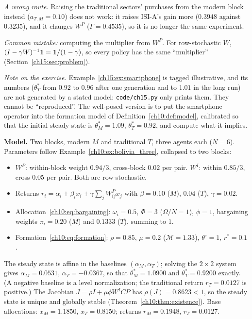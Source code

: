\documentclass[../solutions_manual.tex]{subfiles}
\begin{document}
\emph{A wrong route.} Raising the traditional sectors' purchases from the modern block instead ($a_{T,M} = 0.10$) does not work: it raises ISI-A's gain more ($0.3948$ against $0.3235$), and it changes $W^P$ ($\Gamma = 0.4535$), so it is no longer the same experiment.

\emph{Common mistake:} computing the multiplier from $W^P$. For row-stochastic $W$, $(I - \gamma W)^{-1}\mathbf{1} = \mathbf{1}/(1-\gamma)$, so every policy has the same ``multiplier'' (Section~\ref{ch15:sec:problem}).


\emph{Note on the exercise.} Example~\ref{ch15:ex:smartphone} is tagged illustrative, and its numbers ($\theta^*_T$ from $0.92$ to $0.96$ after one generation and to $1.01$ in the long run) are not generated by a stated model: \nolinkurl{code/ch15.py} only prints them. They cannot be ``reproduced''. The well-posed version is to put the smartphone operator into the formation model of Definition~\ref{ch10:def:model}, calibrated so that the initial steady state is $\theta^*_M = 1.09$, $\theta^*_T = 0.92$, and compute what it implies.

 \textbf{Model.} Two blocks, modern $M$ and traditional $T$, three agents each ($N = 6$). Parameters follow Example~\ref{ch10:ex:bolivia_three}, collapsed to two blocks:
\begin{itemize}
\item $W^P$: within-block weight $0.94/3$, cross-block $0.02$ per pair. $W^I$: within $0.85/3$, cross $0.05$ per pair. Both are row-stochastic.
\item Returns $r_i = \alpha_i + \beta_i x_i + \gamma\sum_j W^P_{ij}x_j$ with $\beta = 0.10$ ($M$), $0.04$ ($T$), $\gamma = 0.02$.
\item Allocation~\eqref{ch10:eq:bargaining}: $\omega_i = 0.5$, $\Phi = 3$ ($\Omega/N = 1$), $\phi = 1$, bargaining weights $\pi_i = 0.20$ ($M$) and $0.1333$ ($T$), summing to $1$.
\item Formation~\eqref{ch10:eq:formation}: $\rho = 0.85$, $\mu = 0.2$ ($\mathcal{M} = 1.33$), $\theta^\circ = 1$, $r^* = 0.1$.
\end{itemize}
The steady state is affine in the baselines $(\alpha_M, \alpha_T)$; solving the $2\times2$ system gives $\alpha_M = 0.0531$, $\alpha_T = -0.0367$, so that $\theta^*_M = 1.0900$ and $\theta^*_T = 0.9200$ exactly. (A negative baseline is a level normalization; the traditional return $r_T = 0.0127$ is positive.) The Jacobian $J = \rho I + \mu\phi W^ICP$ has $\rho(J) = 0.8623 < 1$, so the steady state is unique and globally stable (Theorem~\ref{ch10:thm:existence}). Base allocations: $x_M = 1.1850$, $x_T = 0.8150$; returns $r_M = 0.1948$, $r_T = 0.0127$.
\end{document}
